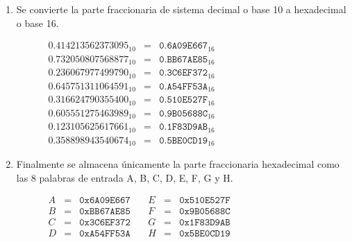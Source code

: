 \documentclass{article}
\begin{document}
\begin{enumerate}
            \item Se convierte la parte fraccionaria de sistema decimal o base 10 a hexadecimal o base 16.
                \begin{figure}[H]
                \centering
                    $\begin{array}{lcl}
                        0.414213562373095_{10} & = & \texttt{0.6A09E667}_{16} \\
                        0.732050807568877_{10} & = & \texttt{0.BB67AE85}_{16} \\
                        0.236067977499790_{10} & = & \texttt{0.3C6EF372}_{16} \\
                        0.645751311064591_{10} & = & \texttt{0.A54FF53A}_{16} \\
                        0.316624790355400_{10} & = & \texttt{0.510E527F}_{16} \\
                        0.605551275463989_{10} & = & \texttt{0.9B05688C}_{16} \\
                        0.123105625617661_{10} & = & \texttt{0.1F83D9AB}_{16} \\
                        0.358898943540674_{10} & = & \texttt{0.5BE0CD19}_{16}
                    \end{array}$
                \end{figure}
            
            \item Finalmente se almacena únicamente la parte fraccionaria hexadecimal como las 8 palabras de entrada A, B, C, D, E, F, G y H.
                \begin{figure}[H]
                \centering
                    $\begin{array}{rclcrcl}
                        A & = & \texttt{0x6A09E667} & \ & E & = & \texttt{0x510E527F} \\
                        B & = & \texttt{0xBB67AE85} & \ & F & = & \texttt{0x9B05688C} \\
                        C & = & \texttt{0x3C6EF372} & \ & G & = & \texttt{0x1F83D9AB} \\
                        D & = & \texttt{0xA54FF53A} & \ & H & = & \texttt{0x5BE0CD19}
                    \end{array}$
                \end{figure}
        \end{enumerate}
\end{document}
